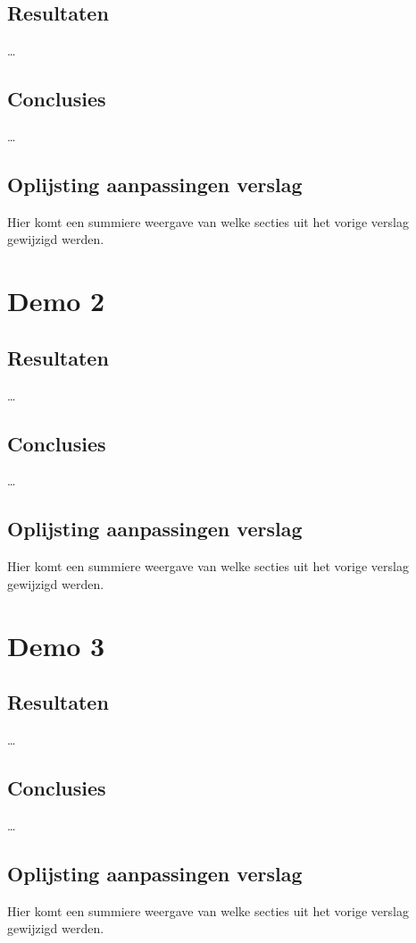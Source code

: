 \documentclass[tt1]{penoverslag}
\begin{document}
\subsection{Resultaten}
\ldots

\subsection{Conclusies}
\ldots

\subsection{Oplijsting aanpassingen verslag}
Hier komt een summiere weergave van welke secties uit het vorige verslag gewijzigd werden.


\section{Demo 2}

\subsection{Resultaten}
\ldots

\subsection{Conclusies}
\ldots

\subsection{Oplijsting aanpassingen verslag}
Hier komt een summiere weergave van welke secties uit het vorige verslag gewijzigd werden.


\section{Demo 3}

\subsection{Resultaten}
\ldots

\subsection{Conclusies}
\ldots

\subsection{Oplijsting aanpassingen verslag}
Hier komt een summiere weergave van welke secties uit het vorige verslag gewijzigd werden.
\end{document}
